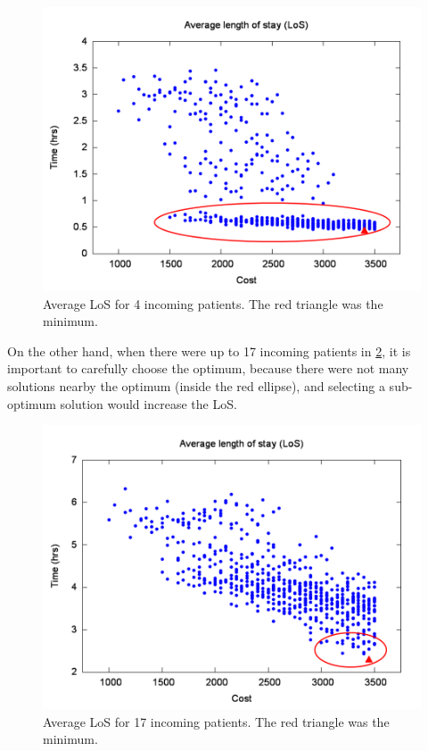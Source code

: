 \begin{figure}[H]
\noindent \begin{centering}
\includegraphics[width=0.95\columnwidth,height=0.19\paperheight]{figs4/v0/LoS-Opt-25-pareto}\caption{Average LoS for 4 incoming patients. The red triangle was the minimum.
\label{fig:pareto-25}}

\par\end{centering}

\end{figure}


On the other hand, when there were up to 17 incoming patients in \ref{fig:pareto-100},
it is important to carefully choose the optimum, because there were
not many solutions nearby the optimum (inside the red ellipse), and
selecting a sub-optimum solution would increase the LoS. 
\begin{figure}[H]
\noindent \centering{}\includegraphics[width=0.95\columnwidth,height=0.19\paperheight]{figs4/v0/LoS-Opt-100-pareto}\caption{Average LoS for 17 incoming patients. The red triangle was the minimum.
\label{fig:pareto-100}}
\end{figure}


